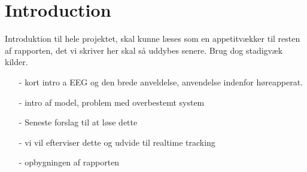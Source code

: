 \chapter*{Introduction}\label{ch:introduction}
Introduktion til hele projektet, skal kunne læses som en appetitvækker til resten af rapporten, det vi skriver her skal så uddybes senere. Brug dog stadigvæk kilder.

\begin{itemize}
\item[-] kort intro a EEG og den brede anveldelse, anvendelse indenfor høreapperat. 
\item[-] intro af model, problem med overbestemt system
\item[-] Seneste forslag til at løse dette 
\item[-] vi vil efterviser dette og udvide til realtime tracking
\item[-] opbygningen af rapporten
\end{itemize}

